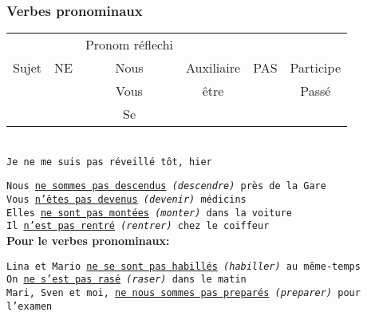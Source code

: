 \documentclass[letterpaper,12pt]{article}
\begin{document}
\begin{sloppypar}
\subsubsection{Verbes pronominaux}
\begin{center}
    \begin{tabular}{|c|c|c|c|c|c|} \hline
             && Pronom réflechi &&& \\
        Sujet&NE&Nous&Auxiliaire&PAS&Participe\\ 
             &&Vous&être&&Passé \\  
             &&Se&&& \\
\hline
\end{tabular}
\vspace{0.3cm}\\ 
\texttt{Je ne me suis pas réveillé tôt, hier}
\end{center}

\texttt{Nous \underline{ne sommes pas descendus} \textit{(descendre)} près de la Gare \\ Vous \underline{n'êtes pas devenus} \textit{(devenir)} médicins \\ Elles \underline{ne sont pas montées} \textit{(monter)} dans la voiture \\ Il \underline{n'est pas rentré} \textit{(rentrer)} chez le coiffeur}
\vspace{0.3cm}\\ 
\textbf{Pour le verbes pronominaux: }

\texttt{Lina et Mario \underline{ne se sont pas habillés} \textit{(habiller)} au même-temps \\ On \underline{ne s'est pas rasé} \textit{(raser)} dans le matin \\ Mari, Sven et moi, \underline{ne nous sommes pas preparés} \textit{(preparer)} pour l'examen}


\end{sloppypar}
\end{document}
